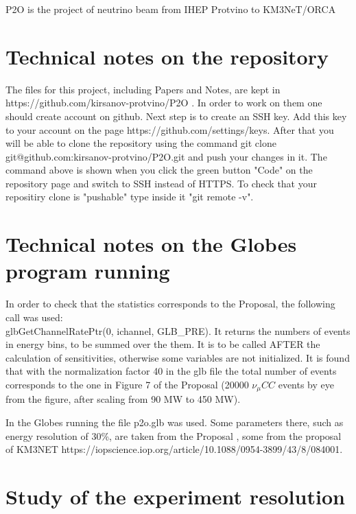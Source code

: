 \documentclass[prd,showpacs,groupedaddress,superscriptaddress,amsmath,amssymb]{revtex4-2} %
\begin{document}
 P2O is the project \cite{Akindinov:2019flp} of neutrino beam from IHEP Protvino to KM3NeT/ORCA \cite{KM3NET}


\section{Technical notes on the repository}


 The files for this project, including Papers and Notes, are kept in https://github.com/kirsanov-protvino/P2O . In order to work
on them one should create account on github. Next step is to create an SSH key. Add this key to your account on the page https://github.com/settings/keys.
After that you will be able to clone the repository using the command git clone git@github.com:kirsanov-protvino/P2O.git and push your changes in it.
The command above is shown when you click the green button "Code" on the repository page and switch to SSH instead of HTTPS.
To check that your repositiry clone is "pushable" type inside it "git remote -v".


\section{Technical notes on the Globes program running}


 In order to check that the statistics corresponds to the Proposal, the following call was used: \\
glbGetChannelRatePtr(0, ichannel, GLB\_PRE).
It returns the numbers of events in energy bins, to be summed over the them. It is to be called AFTER the calculation of sensitivities,
otherwise some variables are not initialized. It is found that with the normalization factor 40 in the glb file the total number of
events corresponds to the one in Figure 7 of the Proposal \cite{Akindinov:2019flp} (20000 $\nu_{\mu}CC$ events by eye from the figure,
after scaling from 90 MW to 450 MW).

 In the Globes running the file p2o.glb was used. Some parameters there, such as energy resolution of 30\%, are taken from the
Proposal \cite{Akindinov:2019flp}, some from the proposal of KM3NET https://iopscience.iop.org/article/10.1088/0954-3899/43/8/084001.


\section{Study of the experiment resolution}
\end{document}
